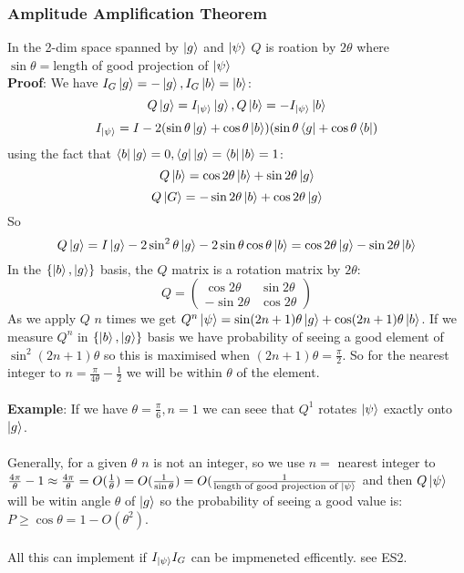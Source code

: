 \documentclass{article}
\begin{document}
{\subsubsection{Amplitude Amplification Theorem}
In the 2-dim space spanned by $\ket{g}$ and $\ket{\psi}$ $Q$ is roation by $2 \theta$ where\\
$\sin \theta = $length of good projection of $\ket{\psi}$\\
\textbf{Proof}: We have $I_G \ket{g} = - \ket{g}, I_G \ket{b} = \ket{b}$:
$$
Q \ket{g} = I_{\ket{\psi}} \ket{g}, Q\ket{b} = - I_{\ket{\psi}} \ket{b}
$$
$$
I_{\ket{\psi}} = I - 2( \sin \theta \ket{g} + \cos \theta \ket{b}) (\sin \theta \bra{g} + \cos \theta \bra{b})
$$
using the fact that $\bra{b}\ket{g} = 0, \bra{g} \ket{g} = \bra{b} \ket{b} = 1$:
$$
Q\ket{b} = \cos 2 \theta \ket{b} + \sin 2 \theta \ket{g}
$$
$$
Q \ket{G} = - \sin 2 \theta \ket{b} + \cos 2 \theta \ket{g}
$$
So
$$
Q \ket{g} = I\ket{g} - 2 \sin^2 \theta \ket{g} - 2 \sin \theta \cos \theta \ket{b} = \cos 2 \theta \ket{g} - \sin 2 \theta \ket{b}
$$
In the $\{ \ket{b}, \ket{g}\}$ basis, the $Q$ matrix is a rotation matrix by $2 \theta$:
$$
                       Q  = \begin{pmatrix} \cos 2 \theta & \sin 2 \theta \\ - \sin 2 \theta & \cos 2 \theta \end{pmatrix}
$$
As we apply $Q$  $n$ times we get $Q^{n} \ket{\psi} = \sin (2n+1) \theta \ket{g} + \cos (2n+1) \theta \ket{b}$. If we measure $Q^{n}$ in $\{ \ket{b}, \ket{g} \}$ basis we have probability of seeing a good element of $\sin^2 (2n+1) \theta$ so this is maximised when $(2n+1) \theta = \frac{\pi}{2}$. So for the nearest integer to $n = \frac{\pi}{4 \theta} - \frac{1}{2}$ we will be within $\theta$ of the element.\\\\
\textbf{Example}: If we have $\theta = \frac{\pi}{6}, n =1$ we can seee that $Q^1$ rotates $\ket{\psi}$ exactly onto $\ket{g}$.\\\\
Generally, for a given $\theta$ $n$ is not an integer, so we use $n=$ nearest integer to $ \frac{4\pi}{\theta} - 1 \approx \frac{4\pi}{\theta} = O(\frac{1}{\theta}) = O(\frac{1}{\sin \theta}) = O(\frac{1}{\text{length of good projection of } \ket{\psi}}$ and then $Q\ket{\psi}$ will be witin angle $\theta$ of $\ket{g}$ so the probability of seeing a good value is: $P \geq \cos \theta = 1 - O(\theta^2)$.\\\\
All this can implement if $I_{\ket{\psi}}I_G$ can be impmeneted efficently. see ES2.\\\\
}
\end{document}

